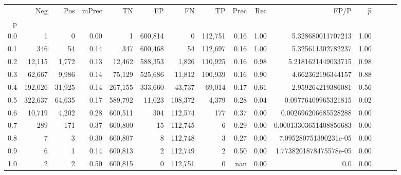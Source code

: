 \begin{tabular}{rrrrrrrrrrrrrrr}
\toprule
{} &      Neg &     Pos & mPrec &       TN &       FP &       FN &       TP &  Prec &   Rec &                    FP/P & $\hat{p}$ \\
p   &          &         &       &          &          &          &          &       &       &                         &           \\
\midrule
0.0 &        1 &       0 &  0.00 &        1 &  600,814 &        0 &  112,751 &  0.16 &  1.00 &       5.328680011707213 &      1.00 \\
0.1 &      346 &      54 &  0.14 &      347 &  600,468 &       54 &  112,697 &  0.16 &  1.00 &       5.325611302782237 &      1.00 \\
0.2 &   12,115 &   1,772 &  0.13 &   12,462 &  588,353 &    1,826 &  110,925 &  0.16 &  0.98 &      5.2181621449033715 &      0.98 \\
0.3 &   62,667 &   9,986 &  0.14 &   75,129 &  525,686 &   11,812 &  100,939 &  0.16 &  0.90 &       4.662362196344157 &      0.88 \\
0.4 &  192,026 &  31,925 &  0.14 &  267,155 &  333,660 &   43,737 &   69,014 &  0.17 &  0.61 &       2.959264219386081 &      0.56 \\
0.5 &  322,637 &  64,635 &  0.17 &  589,792 &   11,023 &  108,372 &    4,379 &  0.28 &  0.04 &     0.09776409965321815 &      0.02 \\
0.6 &   10,719 &   4,202 &  0.28 &  600,511 &      304 &  112,574 &      177 &  0.37 &  0.00 &    0.002696206685528288 &      0.00 \\
0.7 &      289 &     171 &  0.37 &  600,800 &       15 &  112,745 &        6 &  0.29 &  0.00 &  0.00013303651408856683 &      0.00 \\
0.8 &        7 &       3 &  0.30 &  600,807 &        8 &  112,748 &        3 &  0.27 &  0.00 &   7.095280751390231e-05 &      0.00 \\
0.9 &        6 &       1 &  0.14 &  600,813 &        2 &  112,749 &        2 &  0.50 &  0.00 &  1.7738201878475578e-05 &      0.00 \\
1.0 &        2 &       2 &  0.50 &  600,815 &        0 &  112,751 &        0 &   nan &  0.00 &                     0.0 &      0.00 \\
\bottomrule
\end{tabular}
